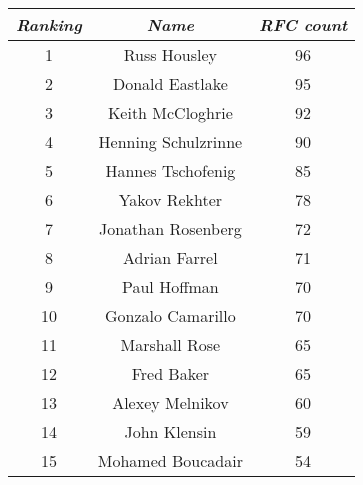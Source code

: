 \documentclass{beamer}
\begin{document}
\begin{frame}


\begin{center}
\begin{table}
\centering
 \begin{tabular}{||c | c | c||} 
 \hline
\textit{Ranking} & \textit{Name} & \textit{RFC count} \\ [1ex] 
 \hline\hline
1 & Russ Housley & 96\\
\hline

2 & Donald Eastlake & 95\\
\hline

3 & Keith McCloghrie & 92\\
\hline

4 & Henning Schulzrinne & 90\\
\hline

5 & Hannes Tschofenig & 85\\
\hline

6 & Yakov Rekhter & 78\\
\hline

7 & Jonathan Rosenberg & 72\\
\hline

8 & Adrian Farrel & 71\\
\hline

9 & Paul Hoffman & 70\\
\hline

10 & Gonzalo Camarillo & 70\\
\hline

11 & Marshall Rose & 65\\
\hline

12 & Fred Baker & 65\\
\hline

13 & Alexey Melnikov & 60\\
\hline

14 & John Klensin & 59\\
\hline

15 & Mohamed Boucadair & 54\\
\hline



\end{tabular}

\end{table}
\end{center}


\end{frame}
\end{document}
